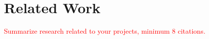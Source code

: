 \section{Related Work}
\label{sec:related} 

\textcolor{red}{Summarize research related to your projects, minimum 8 citations. }